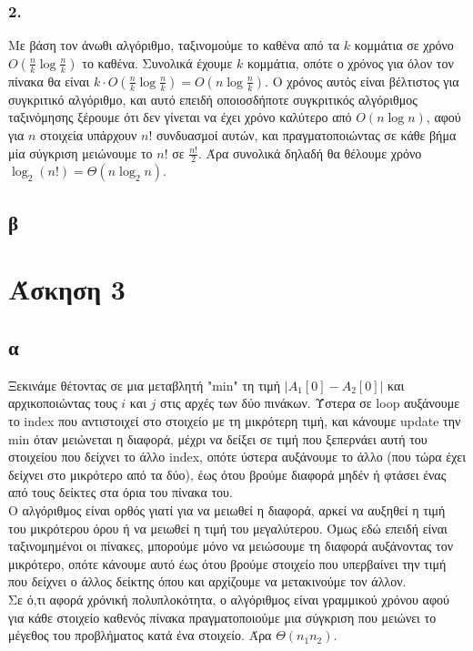 \documentclass[12pt,a4paper]{article}
\begin{document}
  \subsubsection{2.}
    Με βάση τον άνωθι αλγόριθμο, ταξινομούμε το καθένα από τα \( k \) κομμάτια
    σε χρόνο \( Ο(\frac{n}{k}\log{\frac{n}{k}}) \) το καθένα.
    Συνολικά έχουμε \( k \) κομμάτια, οπότε ο χρόνος για όλον τον πίνακα θα 
    είναι \( k\cdot O(\frac{n}{k}\log{\frac{n}{k}})=O(n\log{\frac{n}{k}}) \).
    Ο χρόνος αυτός είναι βέλτιστος για συγκριτικό αλγόριθμο, και αυτό επειδή 
    οποιοσδήποτε συγκριτικός αλγόριθμος ταξινόμησης ξέρουμε ότι δεν γίνεται να 
    έχει χρόνο καλύτερο από \( O(n\log{n}) \), αφού για \(n\) στοιχεία υπάρχουν
    \(n!\) συνδυασμοί αυτών, και πραγματοποιώντας σε κάθε βήμα μία σύγκριση 
    μειώνουμε το \(n!\) σε \(\frac{n!}{2}\). 
    Άρα συνολικά δηλαδή θα θέλουμε χρόνο \(\log_{2}(n!) = \Theta(n\log_{2}{n})\).
  
  \subsection{β}

  \section{Άσκηση 3}

  \subsection{α}
    Ξεκινάμε θέτοντας σε μια μεταβλητή {\latintext "min"} τη τιμή
    \(|A_{1}[0] - A_{2}[0]|\) και αρχικοποιώντας τους \(i\) και \(j\) στις
    αρχές των δύο πινάκων. Ύστερα σε {\latintext loop} αυξάνουμε το
    {\latintext index} που αντιστοιχεί στο στοιχείο με τη μικρότερη τιμή, και
    κάνουμε {\latintext update} την {\latintext min} όταν μειώνεται η διαφορά,
    μέχρι να δείξει σε τιμή που ξεπερνάει αυτή του στοιχείου που δείχνει το άλλο
    {\latintext index}, οπότε ύστερα αυξάνουμε το άλλο (που τώρα έχει δείχνει
    στο μικρότερο από τα δύο), έως ότου βρούμε διαφορά μηδέν ή φτάσει ένας
    από τους δείκτες στα όρια του πίνακα του.\\
    Ο αλγόριθμος είναι ορθός γιατί για να μειωθεί η διαφορά, αρκεί να αυξηθεί
    η τιμή του μικρότερου όρου ή να μειωθεί η τιμή του μεγαλύτερου. Όμως εδώ
    επειδή είναι ταξινομημένοι οι πίνακες, μπορούμε μόνο να μειώσουμε τη
    διαφορά αυξάνοντας τον μικρότερο, οπότε κάνουμε αυτό έως ότου βρούμε
    στοιχείο που υπερβαίνει την τιμή που δείχνει ο άλλος δείκτης όπου και
    αρχίζουμε να μετακινούμε τον άλλον.\\
    Σε ό,τι αφορά χρόνική πολυπλοκότητα, ο αλγόριθμος είναι γραμμικού χρόνου
    αφού για κάθε στοιχείο καθενός πίνακα πραγματοποιούμε μια σύγκριση που
    μειώνει το μέγεθος του προβλήματος κατά ένα στοιχείο.
    Άρα \( \Theta(n_1n_2) \).
\end{document}
